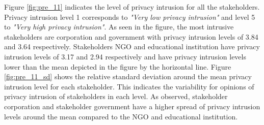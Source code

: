 Figure \ref{fig:pre_11} indicates the level of privacy intrusion for all the stakeholders. Privacy intrusion level 1 corresponds to \textit{"Very low privacy intrusion"} and level 5 to \textit{"Very high privacy intrusion"}. As seen in the figure, the most intrusive stakeholders are corporation and government with privacy intrusion levels of 3.84 and 3.64 respectively. Stakeholders NGO and educational institution have privacy intrusion levels of 3.17 and 2.94 respectively and have privacy intrusion levels lower than the mean depicted in the figure by the horizontal line. Figure \ref{fig:pre_11_sd} shows the relative standard deviation around the mean privacy intrusion level for each stakeholder.  This indicates the variability for opinions of privacy intrusion of stakeholders in each level. As observed, stakeholder corporation and stakeholder government have a higher spread of privacy intrusion levels around the mean compared to the NGO and educational institution.

